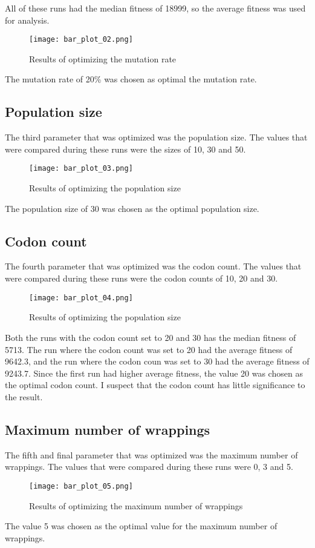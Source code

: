 All of these runs had the median fitness of 18999, so the average fitness was used for analysis.

\begin{figure}[H]
	\centering
	\texttt{[image: bar\_plot\_02.png]}
	\caption{Results of optimizing the mutation rate}
\end{figure}

The mutation rate of 20\% was chosen as optimal the mutation rate.

\subsection{Population size}
The third parameter that was optimized was the population size. The values that were compared during these runs were the sizes of 10, 30 and 50.

\begin{figure}[H]
	\centering
	\texttt{[image: bar\_plot\_03.png]}
	\caption{Results of optimizing the population size}
\end{figure}

The population size of 30 was chosen as the optimal population size.

\subsection{Codon count}
The fourth parameter that was optimized was the codon count. The values that were compared during these runs were the codon counts of 10, 20 and 30.

\begin{figure}[H]
	\centering
	\texttt{[image: bar\_plot\_04.png]}
	\caption{Results of optimizing the population size}
\end{figure}

Both the runs with the codon count set to 20 and 30 has the median fitness of 5713. The run where the codon count was set to 20 had the average fitness of 9642.3, and the run where the codon coun was set to 30 had the average fitness of 9243.7. Since the first run had higher average fitness, the value 20 was chosen as the optimal codon count. I suspect that the codon count has little significance to the result.

\subsection{Maximum number of wrappings}
The fifth and final parameter that was optimized was the maximum number of wrappings. The values that were compared during these runs were 0, 3 and 5.

\begin{figure}[H]
	\centering
	\texttt{[image: bar\_plot\_05.png]}
	\caption{Results of optimizing the maximum number of wrappings}
\end{figure}

The value 5 was chosen as the optimal value for the maximum number of wrappings.